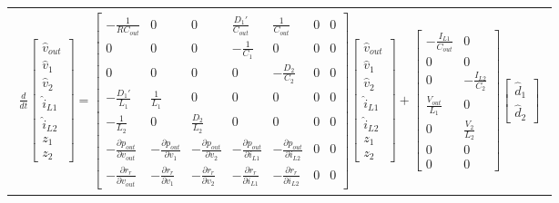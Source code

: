 \documentclass[conference, twocolumn, letterpaper]{IEEEtran}
\begin{document}
\begin{table}[t]
\centering
\begin{tabular}{p{\linewidth}}
\parbox{18cm}{
	\begin{align} \label{eqn:aug_ss_model}
		\frac{d}{dt}
		\begin{bmatrix}
			\hat{v}_{out} \\
			\hat{v}_1 \\
			\hat{v}_2 \\
			\hat{i}_{L1} \\
			\hat{i}_{L2} \\
			z_1 \\
			z_2
		\end{bmatrix}
		=
		\begin{bmatrix}
			-\frac{1}{RC_{out}} & 0 & 0 & \frac{D_1'}{C_{out}} & \frac{1}{C_{out}} & 0 & 0 \\
			0 & 0 & 0 & -\frac{1}{C_1} & 0 & 0 & 0 \\
			0 & 0 & 0 & 0 & -\frac{D_2}{C_2} & 0 & 0\\
			-\frac{D_1'}{L_1} & \frac{1}{L_1} & 0 & 0 & 0 & 0 & 0 \\
			-\frac{1}{L_2} & 0 & \frac{D_2}{L_2} & 0 & 0 & 0 & 0 \\
			-\frac{\partial p_{out}}{\partial v_{out}} & -\frac{\partial p_{out}}{\partial v_{1}} & -\frac{\partial p_{out}}{\partial v_{2}} & -\frac{\partial p_{out}}{\partial i_{L1}} & -\frac{\partial p_{out}}{\partial i_{L2}} & 0 & 0 \\
			-\frac{\partial r_r}{\partial v_{out}} & -\frac{\partial r_r}{\partial v_{1}} & -\frac{\partial r_r}{\partial v_{2}} & -\frac{\partial r_r}{\partial i_{L1}} & -\frac{\partial r_r}{\partial i_{L2}} & 0 & 0
		\end{bmatrix}
		\begin{bmatrix}
			\hat{v}_{out} \\
			\hat{v}_1 \\
			\hat{v}_2 \\
			\hat{i}_{L1} \\
			\hat{i}_{L2} \\
			z_1 \\
			z_2
		\end{bmatrix}
		+
		\begin{bmatrix}
			-\frac{I_{L1}}{C_{out}} & 0 \\
			0 & 0 \\
			0 & -\frac{I_{L2}}{C_2} \\
			\frac{V_{out}}{L_1} & 0 \\
			0 & \frac{V_2}{L_2} \\
			0 & 0 \\
			0 & 0
		\end{bmatrix}
		\begin{bmatrix}
			\hat{d}_1 \\
			\hat{d}_2
		\end{bmatrix}
	\end{align}
}
\end{tabular}
\end{table}
\end{document}

